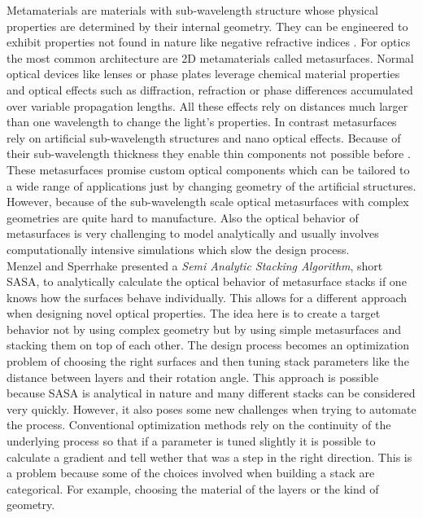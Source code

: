 Metamaterials are materials with sub-wavelength structure whose physical properties are determined by their internal geometry. They can be engineered to exhibit properties not found in nature like negative refractive indices \cite{Shelby2001}.
For optics the most common architecture are 2D metamaterials called metasurfaces.
Normal optical devices like lenses or phase plates leverage chemical material properties and optical effects such as diffraction, refraction or phase differences accumulated over variable propagation lengths.
All these effects rely on distances much larger than one wavelength to change the light's properties.
In contrast metasurfaces rely on artificial sub-wavelength structures and nano optical effects.
Because of their sub-wavelength thickness they enable thin components not possible before \cite{Yu2014}.
These metasurfaces promise custom optical components which can be tailored to a wide range of applications just by changing geometry of the artificial structures. 
However, because of the sub-wavelength scale optical metasurfaces with complex geometries are quite hard to manufacture.
Also the optical behavior of metasurfaces is very challenging to model analytically and usually involves computationally intensive simulations which slow the design process. 
\\

 Menzel and Sperrhake \cite{Menzel2016} presented a \textit{Semi Analytic Stacking Algorithm}, short SASA, to analytically calculate the optical behavior of metasurface stacks if one knows how the surfaces behave individually.
This allows for a different approach when designing novel optical properties.
The idea here is to create a target behavior not by using complex geometry but by using simple metasurfaces and stacking them on top of each other.
The design process becomes an optimization problem of choosing the right surfaces and then tuning stack parameters like the distance between layers and their rotation angle.
This approach is possible because SASA is analytical in nature and many different stacks can be considered very quickly.
However, it also poses some new challenges when trying to automate the process. Conventional optimization methods rely on the continuity of the underlying process so that if a parameter is tuned slightly it is possible to calculate a gradient and tell wether that was a step in the right direction. This is a problem because some of the choices involved when building a stack are categorical. For example, choosing the material of the layers or the kind of geometry.
\\

